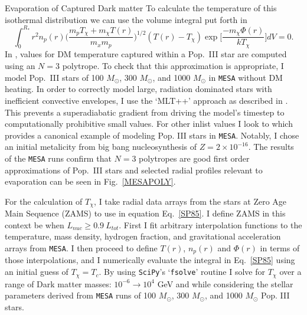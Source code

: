 \documentclass[a4paper,11pt]{article}
\begin{document}
\begin{section}{Evaporation of Captured Dark matter}
    To calculate the temperature of this isothermal distribution we can use the volume integral put forth in \cite{Spergel:1985}
    \begin{equation}
        \int_0^{R_*} r^2 n_p(r) \bigg(\frac{m_p T_\chi + m_\chi T(r)}{m_x m_p} \bigg)^{1/2} (T(r) - T_\chi) \exp \Big[ \frac{-m_\chi \Phi(r)}{k T_\chi} \Big] dV = 0.
        \label{SP85}
    \end{equation}
    In \cite{Ilie:2020popiii}, values for DM temperature captured within a Pop.~III star are computed using an $N=3$ polytrope.
    To check that this approximation is appropriate, I model Pop.~III stars of 100 $M_{\odot}$, 300 $M_{\odot}$, and 1000 $M_{\odot}$ in \texttt{MESA} without DM heating.
    In order to correctly model large, radiation dominated stars with inefficient convective envelopes, I use the `MLT++' approach as described in \cite{MESA:2013}.
    This prevents a superadiabatic gradient from driving the model's timestep to computationally prohibitive small values.
    For other inlist values I look to \cite{Windhorst:2019} which provides a canonical example of modeling Pop. III stars in \texttt{MESA}.
    Notably, I chose an initial metalicity from big bang nucleosynthesis of $Z = 2 \times 10^{-16}$.
    The results of the \texttt{MESA} runs confirm that $N=3$ polytropes are good first order approximations of Pop.~III stars and selected radial profiles relevant to evaporation can be seen in Fig.~\ref{MESAPOLY}.
    
    For the calculation of $T_\chi$, I take radial data arrays from the stars at Zero Age Main Sequence (ZAMS) to use in equation Eq.~\ref{SP85}.
    I define ZAMS in this context be when $L_{nuc} \geq 0.9 ~ L_{tot}$.
    First I fit arbitrary interpolation functions to the temperature, mass density, hydrogen fraction, and gravitational acceleration arrays from \texttt{MESA}.
    I then proceed to define $T(r)$, $n_p(r)$ and $\Phi(r)$ in terms of those interpolations, and I numerically evaluate the integral in Eq.~\ref{SP85} using an initial guess of $T_\chi = T_c$.
    By using \texttt{SciPy}'s `\texttt{fsolve}' routine I solve for $T_\chi$ over a range of Dark matter masses: {$10^{-6} \to 10^4$ GeV} and while considering the stellar parameters derived from \texttt{MESA} runs of 100 $M_\odot$, 300 $M_\odot$, and 1000 $M_\odot$ Pop. III stars. 


\end{section}
\end{document}
